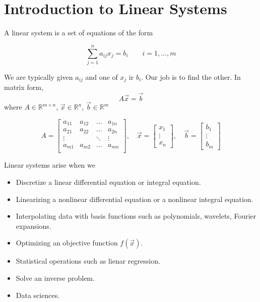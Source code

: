 
\section{Introduction to Linear Systems}

A linear system is a set of equations of the form 

\begin{equation}
    \sum_{j=1}^n a_{ij} x_j  = b_i \qquad i=1, \ldots, m
\end{equation}

We are typically given $a_{ij}$ and one of $x_j$ ir $b_i$. Our job is to find the other. In matrix form, 
\begin{equation}
    A \Vec{x} = \Vec{b}
\end{equation}
where $A \in \mathbb{R}^{m \times n}$, $\Vec{x}\in \mathbb{R}^{n}$, $\Vec{b}\in \mathbb{R}^{m}$

\begin{equation}
    A = 
    \begin{bmatrix}
    a_{11} & a_{12} & \ldots & a_{1n}\\
    a_{21} & a_{22} & \ldots & a_{2n}\\
    \vdots &  & \ddots & \vdots\\
    a_{m1} & a_{m2} & \ldots & a_{mn}\\
    \end{bmatrix}
    ,\quad
    \Vec{x}  = \begin{bmatrix}x_1\\\vdots\\x_n\end{bmatrix}
    ,\quad
    \Vec{b}  = \begin{bmatrix}b_1\\\vdots\\b_m\end{bmatrix}
\end{equation}

Linear systems arise when we 
\begin{itemize}[label={--}]
    \item Discretize a linear differential equation or integral equation.
    \item Linearizing a nonlinear differential equation or a nonlinear integral equation.
    \item Interpolating data with basis functions such as polynomials, wavelets, Fourier expansions.
    \item Optimizing an objective function $f(\Vec{x})$. 
    \item Statistical operations such as lienar regression. 
    \item Solve an inverse problem. 
    \item Data sciences.
\end{itemize}

